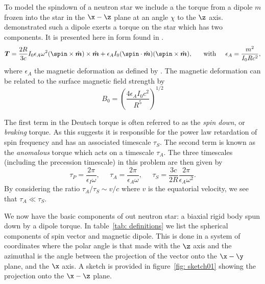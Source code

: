 \documentclass[/home/greg/Thesis/main/main.tex]{subfiles}
\begin{document}
To model the spindown of a neutron star we include a the torque from a dipole
$m$ frozen into the star in the $\x-\z$ plane at an angle $\chi$ to the $\z$
axis. \citet{Deutsch1955} demonstrated such a dipole exerts a torque on the
star which has two components. It is presented here in form found in
\citet{Goldreich1970}.
\begin{equation}
\boldsymbol{T}=\frac{2R}{3c} I_{0}\epsilon_{A}\omega^{2}
               (\spin \times \hat{\boldsymbol{m}})\times \hat{\boldsymbol{m}} 
               + \epsilon_{A}I_{0}(\spin \cdot \hat{\boldsymbol{m}})
               (\spin \times \hat{\boldsymbol{m}}), \;\;\;\;\; \textrm{ with } 
               \;\;\;\; \epsilon_{A} = \frac{m^{2}}{I_{0}R c^{2}},
\label{eqn: torque}
\end{equation}
where $\epsilon_{A}$ the magnetic deformation as defined by \citet{Glampedakis2010}.
The magnetic deformation can be related to the surface magnetic field strength
by 
\begin{equation}
    B_{0} = \left(\frac{4 \epsilon_{A} I_{0} c^{2}}{R^{5}}\right)^{1/2}
    \label{eqn: magnetic field epsA}
\end{equation}

The first term in the Deutsch torque is often referred to as the \emph{spin
down}, or \emph{braking} torque. As this suggests it is responsible for the
power law retardation of spin frequency and has an associated timescale
$\tau_{S}$. The second term is known as the \emph{anomalous} torque which acts
on a timescale $\tau_{A}$. The three timescales (including the precession timescale)
in this problem are then given by
\begin{equation}
\tau_{P}=\frac{2\pi}{\epsilon_{I}\omega},  \;\;\;\;\;
\tau_{A}=\frac{2\pi}{\epsilon_{A}\omega},  \;\;\;\;\; 
\tau_{S}=\frac{3c}{2R}\frac{2\pi}{\epsilon_{A}\omega^{2}}.
\label{eqn: torque timescales}
\end{equation}
By considering the ratio $\tau_{A}/\tau_{S} \sim v/c$ where $v$ is the equatorial
velocity, we see that $\tau_{A} \ll \tau_{S}$. 

We now have the basic components of out neutron star: a biaxial rigid body 
spun down by a dipole torque. In table~\ref{tab: definitions} we list the
spherical components of spin vector and magnetic dipole. This is done in a system
of coordinates where the polar angle is that made with the $\z$ axis and the 
azimuthal is the angle between the projection of the vector onto the $\x-\y$ 
plane, and the $\x$ axis. A sketch is provided in figure~\ref{fig: sketch01}
showing the projection onto the $\x-\z$ plane.
\end{document}
